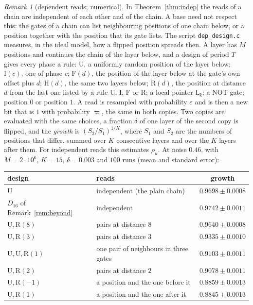 \documentclass[11pt]{amsart}
\theoremstyle{definition}
\theoremstyle{remark}
\newtheorem{remark}[theorem]{Remark}
\newcommand{\eps}{\varepsilon}
\begin{document}
\begin{remark}[dependent reads; numerical]\label{rem:dependent}
In Theorem~\ref{thm:indep} the reads of a chain are independent of each other and of the chain.
A base need not respect this: the gates of a chain can list neighbouring positions of one chain
below, or a position together with the position that its gate lists. The script
\texttt{dep\_design.c} measures, in the ideal model, how a flipped position spreads then. A layer
has $M$ positions and continues the chain of the layer below, and a design of period $T$ gives
every phase a rule: $\mathrm U$, a uniformly random position of the layer below; $\mathrm I(c)$,
one of phase $c$; $\mathrm F(d)$, the position of the layer below at the gate's own offset plus
$d$; $\mathrm H(d)$, the same two layers below; $\mathrm R(d)$, the position at distance $d$ from
the last one listed by a rule $\mathrm U$, $\mathrm I$, $\mathrm F$ or $\mathrm R$; a local
pointer $\mathrm L_k$; a NOT gate; position $0$ or
position $1$. A read is resampled with probability $\eps$ and is then a new bit that is $1$ with
probability $\varpi$, the same in both copies. Two copies are evaluated with the same choices, a
fraction $\delta$ of one layer of the second copy is flipped, and the \emph{growth} is
$(S_2/S_1)^{1/K}$, where $S_1$ and $S_2$ are the numbers of positions that differ, summed over
$K$ consecutive layers and over the $K$ layers after them. For independent reads this estimates
$\rho_u$. At noise $0.46$, with $M=2\cdot10^6$, $K=15$, $\delta=0.003$ and $100$ runs (mean
and standard error):
\begin{center}
\begin{tabular}{llc}
\toprule
design & reads & growth\\
\midrule
$\mathrm U$ & independent (the plain chain) & $0.9698\pm0.0008$\\
$D_{16}$ of Remark~\ref{rem:beyond} & independent & $0.9742\pm0.0011$\\
$\mathrm U,\mathrm R(8)$ & pairs at distance $8$ & $0.9640\pm0.0008$\\
$\mathrm U,\mathrm R(3)$ & pairs at distance $3$ & $0.9335\pm0.0010$\\
$\mathrm U,\mathrm U,\mathrm R(1)$ & one pair of neighbours in three gates & $0.9103\pm0.0011$\\
$\mathrm U,\mathrm R(2)$ & pairs at distance $2$ & $0.9078\pm0.0011$\\
$\mathrm U,\mathrm R(-1)$ & a position and the one before it & $0.8859\pm0.0013$\\
$\mathrm U,\mathrm R(1)$ & a position and the one after it & $0.8845\pm0.0013$\\

\end{tabular}
\end{center}
\end{remark}
\end{document}

